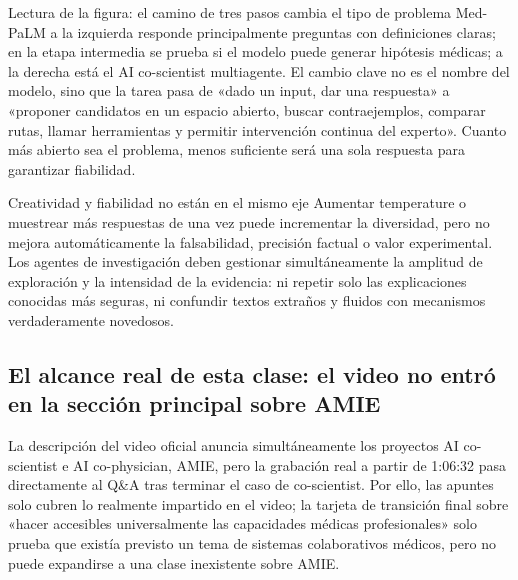 
\begin{knowledgebox}{Lectura de la figura: el camino de tres pasos cambia el tipo de problema}
Med-PaLM a la izquierda responde principalmente preguntas con definiciones claras; en la etapa intermedia se prueba si el modelo puede generar hipótesis médicas; a la derecha está el AI co-scientist multiagente. El cambio clave no es el nombre del modelo, sino que la tarea pasa de «dado un input, dar una respuesta» a «proponer candidatos en un espacio abierto, buscar contraejemplos, comparar rutas, llamar herramientas y permitir intervención continua del experto». Cuanto más abierto sea el problema, menos suficiente será una sola respuesta para garantizar fiabilidad.
\end{knowledgebox}


\begin{warningbox}{Creatividad y fiabilidad no están en el mismo eje}
Aumentar temperature o muestrear más respuestas de una vez puede incrementar la diversidad, pero no mejora automáticamente la falsabilidad, precisión factual o valor experimental. Los agentes de investigación deben gestionar simultáneamente la amplitud de exploración y la intensidad de la evidencia: ni repetir solo las explicaciones conocidas más seguras, ni confundir textos extraños y fluidos con mecanismos verdaderamente novedosos.
\end{warningbox}

\subsection{El alcance real de esta clase: el video no entró en la sección principal sobre AMIE}

La descripción del video oficial anuncia simultáneamente los proyectos AI co-scientist e AI co-physician, AMIE, pero la grabación real a partir de 1:06:32 pasa directamente al Q\&A tras terminar el caso de co-scientist. Por ello, las apuntes solo cubren lo realmente impartido en el video; la tarjeta de transición final sobre «hacer accesibles universalmente las capacidades médicas profesionales» solo prueba que existía previsto un tema de sistemas colaborativos médicos, pero no puede expandirse a una clase inexistente sobre AMIE.

